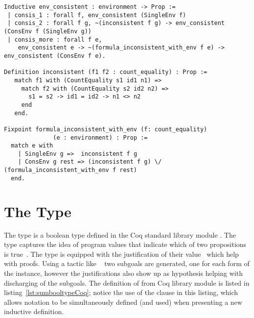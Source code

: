
\begin{minipage}[c]{0.95\textwidth}
\begin{lstlisting}
Inductive env_consistent : environment -> Prop :=
 | consis_1 : forall f, env_consistent (SingleEnv f)
 | consis_2 : forall f g, ~(inconsistent f g) -> env_consistent (ConsEnv f (SingleEnv g))
 | consis_more : forall f e,
    env_consistent e -> ~(formula_inconsistent_with_env f e) -> env_consistent (ConsEnv f e).

Definition inconsistent (f1 f2 : count_equality) : Prop :=
   match f1 with (CountEquality s1 id1 n1) =>
     match f2 with (CountEquality s2 id2 n2) =>
       s1 = s2 -> id1 = id2 -> n1 <> n2
     end
   end.

Fixpoint formula_inconsistent_with_env (f: count_equality)
			  (e : environment) : Prop :=
  match e with
    | SingleEnv g =>  inconsistent f g
    | ConsEnv g rest => (inconsistent f g) \/ (formula_inconsistent_with_env f rest)
  end.
\end{lstlisting}
\end{minipage}

\section{The  Type}\label{sec:sumboolsection}

The  type is a boolean type defined in the Coq standard library module . The  type captures the idea of program values that indicate which of two propositions is true~\cite{chlipalacpdt2011}. The  type is equipped with the justification of their value~\cite{Coq:manual} which help with proofs. Using a tactic like ~\cite{Coq:manual} two subgoals are generated, one for each form of the  instance, however the justifications also show up as hypothesis helping with discharging of the subgoals. The definition of  from Coq library module  is listed in listing~\ref{lst:sumbooltypeCoq}; notice the use of the  clause in this listing, which allows notation to be simultaneously defined (and used) when presenting a new inductive definition.

